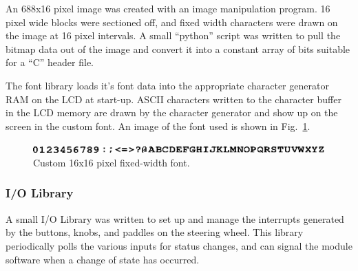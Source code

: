 An 688x16 pixel image was created with an image manipulation program. 16 pixel wide blocks were sectioned off, and fixed width characters were drawn on the image at 16 pixel intervals. A small ``python'' script was written to pull the bitmap data out of the image and convert it into a constant array of bits suitable for a ``C'' header file.

The font library loads it's font data into the appropriate character generator RAM on the LCD at start-up. ASCII characters written to the character buffer in the LCD memory are drawn by the character generator and show up on the screen in the custom font. An image of the font used is shown in Fig.\ \ref{fig:driver_interface_font}.

\begin{figure}[H]
 \centering
 \includegraphics[scale=1]{implementation/figures/driver_interface_font.eps}
 \caption{Custom 16x16 pixel fixed-width font.}
 \label{fig:driver_interface_font}
\end{figure}

\subsubsection{I/O Library}

A small I/O Library was written to set up and manage the interrupts generated by the buttons, knobs, and paddles on the steering wheel. This library periodically polls the various inputs for status changes, and can signal the module software when a change of state has occurred.
